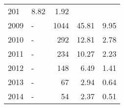 \begin{longtable}{lXrrr}
       \num{201} &
       \num[round-mode=places,round-precision=2]{8.82} &
         \num[round-mode=places,round-precision=2]{1.92} \\

     2009 &
     \multicolumn{1}{X}{ -  } &


       \num{1044} &
       \num[round-mode=places,round-precision=2]{45.81} &
         \num[round-mode=places,round-precision=2]{9.95} \\

     2010 &
     \multicolumn{1}{X}{ -  } &


       \num{292} &
       \num[round-mode=places,round-precision=2]{12.81} &
         \num[round-mode=places,round-precision=2]{2.78} \\

     2011 &
     \multicolumn{1}{X}{ -  } &


       \num{234} &
       \num[round-mode=places,round-precision=2]{10.27} &
         \num[round-mode=places,round-precision=2]{2.23} \\

     2012 &
     \multicolumn{1}{X}{ -  } &


       \num{148} &
       \num[round-mode=places,round-precision=2]{6.49} &
         \num[round-mode=places,round-precision=2]{1.41} \\

     2013 &
     \multicolumn{1}{X}{ -  } &


       \num{67} &
       \num[round-mode=places,round-precision=2]{2.94} &
         \num[round-mode=places,round-precision=2]{0.64} \\

     2014 &
     \multicolumn{1}{X}{ -  } &


       \num{54} &
       \num[round-mode=places,round-precision=2]{2.37} &
         \num[round-mode=places,round-precision=2]{0.51} \\


\end{longtable}
